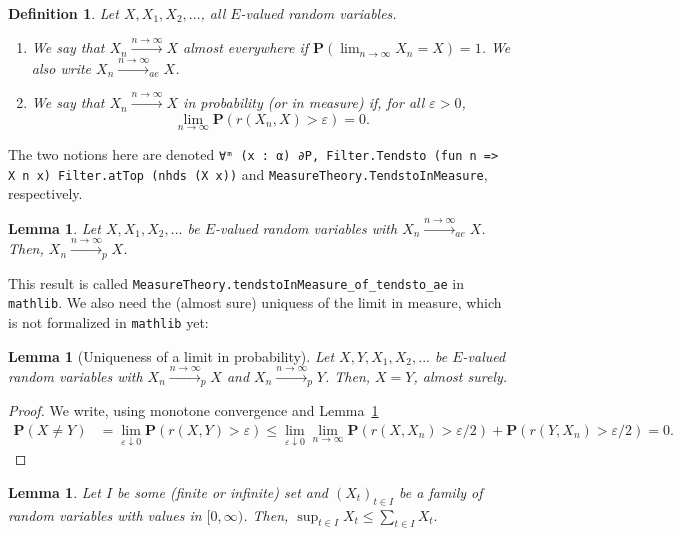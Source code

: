 \documentclass{article}
\newtheorem{lemma}[proposition]{Lemma}
\newtheorem{definition}[proposition]{Definition}
\theoremstyle{definition}
\theoremstyle{step} \newtheorem{step}{Step}
\newcommand{\leanline}[1]{\texttt{#1}}%
\begin{document}
\begin{definition}
  Let $X,X_1,X_2,...$, all $E$-valued random variables.
  \begin{enumerate}
    \item We say that $X_n \xrightarrow{n\to\infty} X$ almost everywhere
          if $\mathbf P(\lim_{n\to\infty} X_n = X) = 1$. We also write
          $X_n\xrightarrow{n\to\infty}_{ae} X$.
    \item We say that $X_n \xrightarrow{n\to\infty} X$ in probability
          (or in measure) if, for all $\varepsilon>0$,
          $$ \lim_{n\to\infty} \mathbf P(r(X_n, X) > \varepsilon) = 0.$$
  \end{enumerate}
\end{definition}
The two notions here are denoted \leanline{∀ᵐ (x : α) ∂P,
  Filter.Tendsto (fun n => X n x) Filter.atTop (nhds (X x))} and
\leanline{MeasureTheory.TendstoInMeasure}, respectively.

\begin{lemma}\label{l:aep}
  Let $X,X_1,X_2,...$ be $E$-valued random variables with $X_n
    \xrightarrow{n\to\infty}_{ae} X$. Then, $X_n
    \xrightarrow{n\to\infty}_{p} X$.
\end{lemma}

This result is called
\leanline{MeasureTheory.tendstoInMeasure_of_tendsto_ae} in
\leanline{mathlib}. We also need the (almost sure) uniquess of the
limit in measure, which is not formalized in \leanline{mathlib} yet:

\begin{lemma}[Uniqueness of a limit in probability]\label{l:puni}
  Let $X,Y,X_1,X_2,...$ be $E$-valued random variables with $X_n
    \xrightarrow{n\to\infty}_{p} X$ and $X_n
    \xrightarrow{n\to\infty}_{p} Y$. Then, $X=Y$, almost surely.
\end{lemma}

\begin{proof}
  We write, using monotone convergence and Lemma~\ref{l:aep}
  \begin{align*}
    \mathbf P(X\neq Y) & = \lim_{\varepsilon \downarrow 0} \mathbf
    P(r(X,Y)>\varepsilon) \leq \lim_{\varepsilon \downarrow 0}
    \lim_{n\to\infty}\mathbf P(r(X,X_n)>\varepsilon/2) + \mathbf
    P(r(Y,X_n)>\varepsilon/2) = 0.
  \end{align*}
\end{proof}

\begin{lemma}\label{l:supsum}
  Let $I$ be some (finite or infinite) set and $(X_t)_{t\in I}$ be a
  family of random variables with values in $[0,\infty)$. Then,
  $\sup_{t\in I} X_t \leq \sum_{t\in I} X_t.$
\end{lemma}
\end{document}
